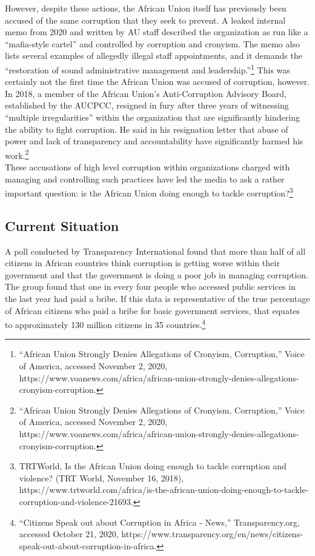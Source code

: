 \documentclass[10pt, letterpaper]{article}
\begin{document}
However, despite these actions, the African Union itself has previously
been accused of the same corruption that they seek to prevent. A leaked
internal memo from 2020 and written by AU staff described the
organization as run like a ``mafia-style cartel'' and controlled by
corruption and cronyism. The memo also lists several examples of
allegedly illegal staff appointments, and it demands the ``restoration
of sound administrative management and leadership.''\footnote{``African
  Union Strongly Denies Allegations of Cronyism, Corruption,'' Voice of
  America, accessed November 2, 2020,
  https://www.voanews.com/africa/african-union-strongly-denies-allegations-cronyism-corruption.}
This was certainly not the first time the African Union was accused of
corruption, however. In 2018, a member of the African Union's
Anti-Corruption Advisory Board, established by the AUCPCC, resigned in
fury after three years of witnessing ``multiple irregularities'' within
the organization that are significantly hindering the ability to fight
corruption. He said in his resignation letter that abuse of power and
lack of transparency and accountability have significantly harmed his
work.\footnote{``African Union Strongly Denies Allegations of Cronyism,
  Corruption,'' Voice of America, accessed November 2, 2020,
  https://www.voanews.com/africa/african-union-strongly-denies-allegations-cronyism-corruption.} \\

These accusations of high level corruption within organizations charged
with managing and controlling such practices have led the media to ask a
rather important question: is the African Union doing enough to tackle
corruption?\footnote{TRTWorld, Is the African Union doing enough to
  tackle corruption and violence? (TRT World, November 16, 2018),
  https://www.trtworld.com/africa/is-the-african-union-doing-enough-to-tackle-corruption-and-violence-21693.} \\

\subsection{Current Situation}

A poll conducted by Transparency International found that more than half
of all citizens in African countries think corruption is getting worse
within their government and that the government is doing a poor job in
managing corruption. The group found that one in every four people who
accessed public services in the last year had paid a bribe. If this data
is representative of the true percentage of African citizens who paid a
bribe for basic government services, that equates to approximately 130
million citizens in 35 countries.\footnote{``Citizens Speak out about
  Corruption in Africa - News,'' Transparency.org, accessed October 21,
  2020,
  https://www.transparency.org/en/news/citizens-speak-out-about-corruption-in-africa.} \\
\end{document}
